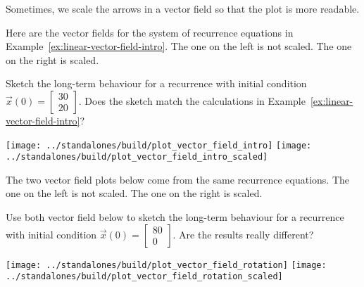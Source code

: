 \documentclass[../main.tex]{subfiles}
\begin{document}
Sometimes, we scale the arrows in a vector field so that the plot is more readable. 
\begin{example}
  Here are the vector fields for the system of recurrence equations in Example~\ref{ex:linear-vector-field-intro}. The one on the left is not scaled. The one on the right is scaled.

  Sketch the long-term behaviour for a recurrence with initial condition \(\vec{x}(0) = \begin{bmatrix} 30 \\ 20 \end{bmatrix}\).  Does the sketch match the calculations in Example~\ref{ex:linear-vector-field-intro}?


  \begin{center}
    \texttt{[image: ../standalones/build/plot\_vector\_field\_intro]}
    \quad
    \texttt{[image: ../standalones/build/plot\_vector\_field\_intro\_scaled]}
  \end{center}
\end{example}
\vfill{}
\clearpage

\begin{example}
  The two vector field plots below come from the same recurrence equations. The one on the left is not scaled. The one on the right is scaled. 

  Use both vector field below to sketch the long-term behaviour for a recurrence with initial condition \(\vec{x}(0) = \begin{bmatrix} 80 \\ 0 \end{bmatrix}\). Are the results really different?

  \begin{center}
    \texttt{[image: ../standalones/build/plot\_vector\_field\_rotation]}
    \quad
    \texttt{[image: ../standalones/build/plot\_vector\_field\_rotation\_scaled]}
  \end{center}
\end{example}
\end{document}
